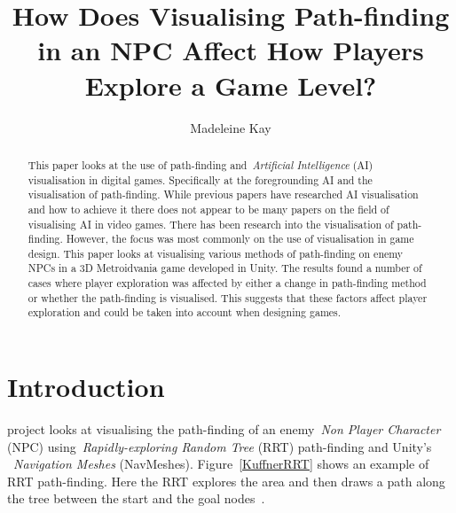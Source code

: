 \documentclass[journal]{IEEEtran}
\begin{document}
	\title{ How Does Visualising Path-finding in an NPC Affect How Players Explore a Game Level?}
	\author{Madeleine Kay}
	
	
	\maketitle
	
	\begin{abstract}
		This paper looks at the use of path-finding and~\textit{Artificial Intelligence} (AI) visualisation in digital games.   Specifically at the foregrounding AI and the visualisation of path-finding. 
		While previous papers have researched AI visualisation and how to achieve it there does not appear to be many papers on the field of visualising AI in video games. There has been research into the visualisation of path-finding. However, the focus was most commonly on the use of visualisation in game design. 
		This paper looks at visualising various methods of path-finding on enemy NPCs in a 3D Metroidvania game developed in Unity.
		The results found a number of cases where player exploration was affected by either a change in path-finding method or whether the path-finding is visualised. This suggests that these factors affect player exploration and could be taken into account when designing games.
		
	\end{abstract}
	
	\section{Introduction} \label{introduction}
	 project looks at visualising the path-finding of an enemy~\textit{Non Player Character} (NPC) using~\textit{Rapidly-exploring Random Tree} (RRT) path-finding and Unity's ~\textit{Navigation Meshes} (NavMeshes).  Figure~\ref{KuffnerRRT} shows an example of RRT path-finding. Here the RRT explores the area and then draws a path along the tree between the start and the goal nodes~\cite{Kuffner2000}. 
	
\end{document}
